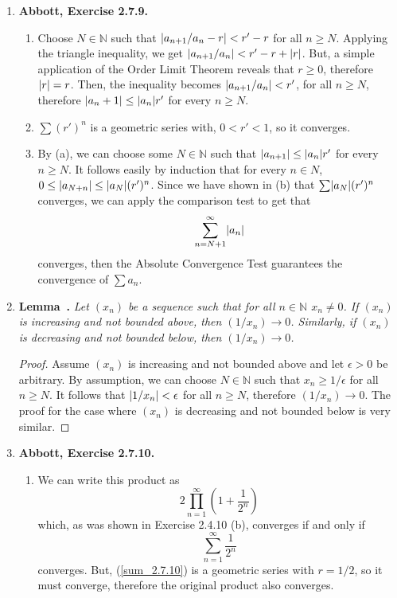 \documentclass{article}
\newcounter{lemmaCounter}
\newenvironment{shortlemma}{\refstepcounter{lemmaCounter}
\noindent\textbf{Lemma~\thelemmaCounter.}\em}
\DeclarePairedDelimiter\abs{\lvert}{\rvert}
\newcommand{\N}{\mathbb{N}}
\newcommand{\exc}[2][Abbott]{\item \textbf{#1, Exercise #2.}}
\newcommand{\lep}[1][L]{#1et $\epsilon > 0$ be arbitrary}
\begin{document}
\begin{enumerate}
    \exc{2.7.9}
    \begin{enumerate}
        \item Choose $N \in \N$ such that $\abs*{a_{n+1}/a_n - r} < r'- r$ for all $n \geq N$. Applying the triangle inequality, we get $\abs*{a_{n+1}/a_n} < r' -r + \abs*{r}$. But, a simple application of the Order Limit Theorem reveals that $r \geq 0$, therefore $\abs*{r}=r$. Then, the inequality becomes $\abs*{a_{n+1}/a_n} < r'$, for all $n \geq N$, therefore $\abs*{a_n+1} \leq \abs*{a_n} r'$ for every $n \geq N$.
        
        \item $\sum (r')^n$ is a geometric series with, $0 < r' < 1$, so it converges.
        
        \item By (a), we can choose some $N \in \N$ such that $\abs*{a_{n+1}} \leq \abs*{a_n} r'$ for every $n \geq N$. It follows easily by induction that for every $n \in N$, $0 \leq \abs*{a_{N+n}} \leq \abs*{a_N} (r')^n$. Since we have shown in (b) that $\sum \abs*{a_N} (r')^n$ converges, we can apply the comparison test to get that 
        \begin{equation*}
            \sum_{n=N+1}^\infty \abs*{a_n}
        \end{equation*} converges, then the Absolute Convergence Test guarantees the convergence of $\sum a_n$.
    \end{enumerate} 
    
    \item \begin{shortlemma} \label{lem_1OverInfinityIsZero}
        Let $(x_n)$ be a sequence such that for all $n \in \N$ $x_n \neq 0$.
        If $(x_n)$ is increasing and not bounded above, then $(1/x_n) \to 0$. Similarly, if $(x_n)$ is decreasing and not bounded below, then $(1/x_n) \to 0$.
    \end{shortlemma}
    \begin{proof}
        Assume $(x_n)$ is increasing and not bounded above and \lep[l]. By assumption, we can choose $N \in \N$ such that $x_n \geq 1/\epsilon$ for all $n \geq N$. It follows that $\abs*{1/x_n} < \epsilon$ for all $n \geq N$, therefore $(1/x_n) \to 0$. The proof for the case where $(x_n)$ is decreasing and not bounded below is very similar.
    \end{proof}
    
    \exc{2.7.10}
    \begin{enumerate}
        \item We can write this product as 
        \begin{equation*}
            2  \prod_{n=1}^\infty (1 + \frac{1}{2^n})
        \end{equation*} which, as was shown in Exercise 2.4.10 (b), converges if and only if 
        \begin{equation} \label{sum_2.7.10}
            \sum_{n=1}^\infty \frac{1}{2^n}
        \end{equation} converges. But, (\ref{sum_2.7.10}) is a geometric series with $r = 1/2$, so it must converge, therefore the original product also converges.
        

\end{enumerate}
\end{enumerate}
\end{document}

